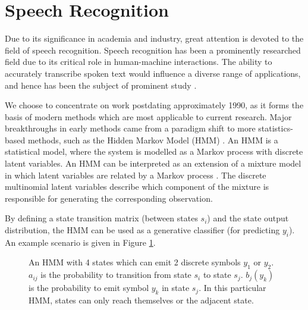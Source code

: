 \documentclass[12pt]{llncs}
\begin{document}
\section{Speech Recognition}
\label{sec:speechrecognition}
Due to its significance in academia and industry, great attention is devoted to the field of speech recognition. Speech recognition has been a prominently researched field due to its critical role in human-machine interactions. The ability to accurately transcribe spoken text would influence a diverse range of applications, and hence has been the subject of prominent study \cite{juang2005automatic}. 

We choose to concentrate on work postdating approximately 1990, as it forms the basis of modern methods which are most applicable to current research. Major breakthroughs in early methods came from a paradigm shift to more statistics-based methods, such as the Hidden Markov Model (HMM) \cite{juang2005automatic}. An HMM is a statistical model, where the system is modelled as a Markov process with discrete latent variables. An HMM can be interpreted as an extension of a mixture model \cite{lindsay1995mixture} in which latent variables are related by a Markov process \cite{bishop2006pattern}. The discrete multinomial latent variables describe which component of the mixture is responsible for generating the corresponding observation.

By defining a state transition matrix (between states $s_i$) and the state output distribution, the HMM can be used as a generative classifier (for predicting $y_i$). An example scenario is given in Figure \ref{fig:HMM}.

\begin{figure}[htbp]
\begin{center}
\end{center}
\caption{An HMM with 4 states which can emit 2 discrete symbols $y_1$ or $y_2$.
$a_{ij}$ is the probability to transition from state $s_i$ to state $s_j$.
$b_j(y_k)$ is the probability to emit symbol $y_k$ in state $s_j$.
In this particular HMM, states can only reach themselves or the adjacent state.}
\label{fig:HMM}
\end{figure}
\end{document}
